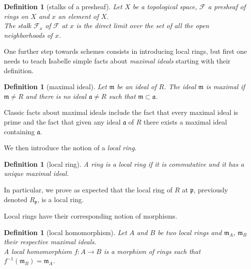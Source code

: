\documentclass[12pt]{scrartcl}
\newtheorem{definition}[proposition]{Definition}
\begin{document}
\begin{definition}[stalks of a presheaf]
	Let $X$ be a topological space, $\mathscr{F}$ a presheaf of rings on $X$ and $x$ an element of $X$. \\
	The stalk $\mathscr{F}_x$ of $\mathscr{F}$ at $x$ is the direct limit over the set of all the open neighborhoods of $x$.   
\end{definition}


One further step towards schemes consists in introducing local rings, but first one needs to teach Isabelle simple facts about \emph{maximal ideals} starting with their definition. 

\begin{definition}[maximal ideal]
	Let $\mathfrak{m}$ be an ideal of $R$. The ideal $\mathfrak{m}$ is maximal if $\mathfrak{m} \neq R$ and there is no ideal $\mathfrak{a} \neq R$ such that $\mathfrak{m} \subset \mathfrak{a}$.
\end{definition}


Classic facts about maximal ideals include the fact that every maximal ideal is prime and the fact that given any ideal $\mathfrak{a}$ of $R$ there exists a maximal ideal containing $\mathfrak{a}$.

	
We then introduce the notion of a \emph{local ring}.

\begin{definition}[local ring]
	A ring is a local ring if it is commutative and it has a unique maximal ideal. 	
\end{definition}


In particular, we prove as expected that the local ring of $R$ at $\mathfrak{p}$, previously denoted $R_{\mathfrak{p}}$, is a local ring.


Local rings have their corresponding notion of morphisms. 

\begin{definition}[local homomorphism]
	Let $A$ and $B$ be two local rings and $\mathfrak{m}_A$, $\mathfrak{m}_B$ their respective maximal ideals. \\
	A local homomorphism $f: A \rightarrow B$ is a morphism of rings such that $f^{-1} (\mathfrak{m}_B) = \mathfrak{m}_A$. 
\end{definition}
\end{document}
